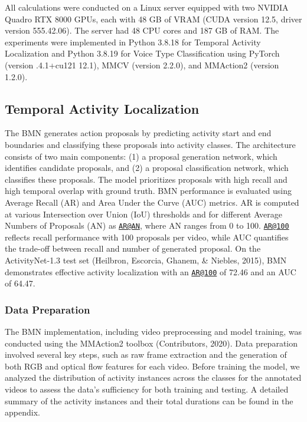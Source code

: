 \documentclass[
  man,floatsintext]{apa6}
\begin{document}
All calculations were conducted on a Linux server equipped with two NVIDIA Quadro RTX 8000 GPUs, each with 48 GB of VRAM (CUDA version 12.5, driver version 555.42.06). The server had 48 CPU cores and 187 GB of RAM. The experiments were implemented in Python 3.8.18 for Temporal Activity Localization and Python 3.8.19 for Voice Type Classification using PyTorch (version .4.1+cu121 12.1), MMCV (version 2.2.0), and MMAction2 (version 1.2.0).

\subsection{Temporal Activity Localization}\label{temporal-activity-localization}

The BMN generates action proposals by predicting activity start and end boundaries and classifying these proposals into activity classes. The architecture consists of two main components: (1) a proposal generation network, which identifies candidate proposals, and (2) a proposal classification network, which classifies these proposals. The model prioritizes proposals with high recall and high temporal overlap with ground truth.
BMN performance is evaluated using Average Recall (AR) and Area Under the Curve (AUC) metrics. AR is computed at various Intersection over Union (IoU) thresholds and for different Average Numbers of Proposals (AN) as \href{mailto:AR@AN}{\nolinkurl{AR@AN}}, where AN ranges from 0 to 100. \href{mailto:AR@100}{\nolinkurl{AR@100}} reflects recall performance with 100 proposals per video, while AUC quantifies the trade-off between recall and number of generated proposal. On the ActivityNet-1.3 test set (Heilbron, Escorcia, Ghanem, \& Niebles, 2015), BMN demonstrates effective activity localization with an \href{mailto:AR@100}{\nolinkurl{AR@100}} of 72.46 and an AUC of 64.47.

\subsubsection{Data Preparation}\label{data-preparation}

The BMN implementation, including video preprocessing and model training, was conducted using the MMAction2 toolbox (Contributors, 2020). Data preparation involved several key steps, such as raw frame extraction and the generation of both RGB and optical flow features for each video. Before training the model, we analyzed the distribution of activity instances across the classes for the annotated videos to assess the data's sufficiency for both training and testing. A detailed summary of the activity instances and their total durations can be found in the appendix.
\end{document}
